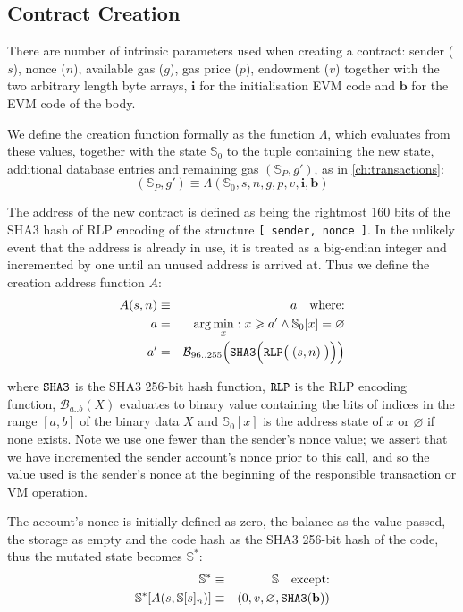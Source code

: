 \documentclass[9pt,oneside]{amsart}
\begin{document}
\begin{multicols}{2}
\section{Contract Creation} \label{ch:create}

There are number of intrinsic parameters used when creating a contract: sender ($s$), nonce ($n$), available gas ($g$), gas price ($p$), endowment ($v$) together with the two arbitrary length byte arrays, $\mathbf{i}$ for the initialisation EVM code and $\mathbf{b}$ for the EVM code of the body.

We define the creation function formally as the function $\Lambda$, which evaluates from these values, together with the state $\mathbb{S}_0$ to the tuple containing the new state, additional database entries and remaining gas $(\mathbb{S}_P, g')$, as in \ref{ch:transactions}:
\begin{equation}
(\mathbb{S}_P, g') \equiv \Lambda(\mathbb{S}_0, s, n, g, p, v, \mathbf{i}, \mathbf{b})
\end{equation}

The address of the new contract is defined as being the rightmost 160 bits of the SHA3 hash of RLP encoding of the structure \texttt{[ sender, nonce ]}. In the unlikely event that the address is already in use, it is treated as a big-endian integer and incremented by one until an unused address is arrived at. Thus we define the creation address function $A$:
\begin{eqnarray}
A(s, n) & \equiv & a \quad \text{where:} \\
a & = & \arg \min_x : x \geqslant a' \wedge \mathbb{S}_0[x] = \varnothing \\
a' & = & \mathcal{B}_{96..255}\Big(\mathtt{\tiny SHA3}\Big(\mathtt{\tiny RLP}\big(\;(s, n)\;\big)\Big)\Big)
\end{eqnarray}

where $\mathtt{\tiny SHA3}$ is the SHA3 256-bit hash function, $\mathtt{\tiny RLP}$ is the RLP encoding function, $\mathcal{B}_{a..b}(X)$ evaluates to binary value containing the bits of indices in the range $[a, b]$ of the binary data $X$ and $\mathbb{S}_0[x]$ is the address state of $x$ or $\varnothing$ if none exists. Note we use one fewer than the sender's nonce value; we assert that we have incremented the sender account's nonce prior to this call, and so the value used is the sender's nonce at the beginning of the responsible transaction or VM operation.

The account's nonce is initially defined as zero, the balance as the value passed, the storage as empty and the code hash as the SHA3 256-bit hash of the code, thus the mutated state becomes $\mathbb{S}^*$:
\begin{eqnarray}
\mathbb{S}^* & \equiv & \mathbb{S} \quad \text{except:} \\
\mathbb{S}^*[A(s, \mathbb{S}[s]_n)] & \equiv & ( 0, v, \varnothing, \mathtt{\tiny SHA3}(\mathbf{b}) )
\end{eqnarray}


\end{multicols}
\end{document}
